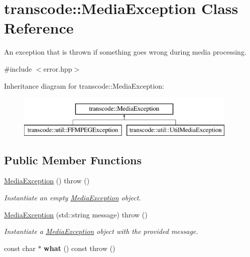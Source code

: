 \hypertarget{classtranscode_1_1MediaException}{
\section{transcode::MediaException Class Reference}
\label{classtranscode_1_1MediaException}
}


An exception that is thrown if something goes wrong during media processing.  




{\ttfamily \#include $<$error.hpp$>$}

Inheritance diagram for transcode::MediaException:\begin{figure}[H]
\begin{center}
\leavevmode
\includegraphics[height=2.000000cm]{classtranscode_1_1MediaException}
\end{center}
\end{figure}
\subsection*{Public Member Functions}
\begin{DoxyCompactItemize}
\item 
\hyperlink{classtranscode_1_1MediaException_ab7bb21af19aaa3d36e45a4504b538922}{MediaException} ()  throw ()
\begin{DoxyCompactList}\small\item\em Instantiate an empty \hyperlink{classtranscode_1_1MediaException}{MediaException} object. \item\end{DoxyCompactList}\item 
\hyperlink{classtranscode_1_1MediaException_ab18693f11e51b0c9684e5c6df0901313}{MediaException} (std::string message)  throw ()
\begin{DoxyCompactList}\small\item\em Instantiate a \hyperlink{classtranscode_1_1MediaException}{MediaException} object with the provided message. \item\end{DoxyCompactList}\item 
\hypertarget{classtranscode_1_1MediaException_ab662d6628667f2105adf95744f23d357}{
const char $\ast$ {\bfseries what} () const   throw ()}
\label{classtranscode_1_1MediaException_ab662d6628667f2105adf95744f23d357}

\end{DoxyCompactItemize}



